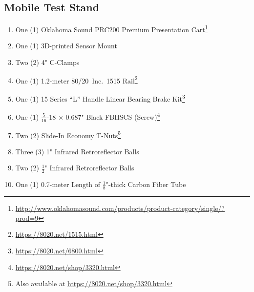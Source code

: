 \subsection{Mobile Test Stand}
\begin{enumerate}
\item One (1) Oklahoma Sound PRC200 Premium Presentation Cart\footnote{\url{http://www.oklahomasound.com/products/product-category/single/?prod=9}}
\item One (1) 3D-printed Sensor Mount
\item Two (2) 4" C-Clamps
\item One (1) 1.2-meter 80/20\textsuperscript{\textregistered}~Inc.\ 1515 Rail\footnote{\url{https://8020.net/1515.html}}
\item One (1) 15 Series ``L'' Handle Linear Bearing Brake Kit\footnote{\url{https://8020.net/6800.html}}
\item One (1) $\frac{5}{16}$-18 $\times$ 0.687" Black FBHSCS (Screw)\footnote{\url{https://8020.net/shop/3320.html}}
\item Two (2) Slide-In Economy T-Nuts\footnote{Also available at \url{https://8020.net/shop/3320.html}}
\item Three (3) 1" Infrared Retroreflector Balls
\item Two (2) $\frac{1}{2}$" Infrared Retroreflector Balls
\item One (1) 0.7-meter Length of $\frac{1}{8}$"-thick Carbon Fiber Tube
\end{enumerate}
